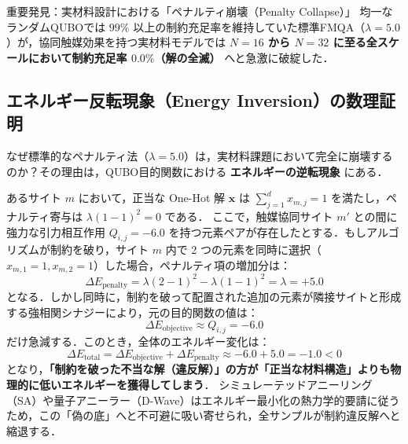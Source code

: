 \documentclass[11pt,a4paper]{ltjsarticle}
\begin{document}
\begin{alertbox}{重要発見：実材料設計における「ペナルティ崩壊（Penalty Collapse）」}
均一なランダムQUBOでは $99\%$ 以上の制約充足率を維持していた標準FMQA（$\lambda=5.0$）が，協同触媒効果を持つ実材料モデルでは \textbf{$N=16$ から $N=32$ に至る全スケールにおいて制約充足率 $0.0\%$（解の全滅）} へと急激に破綻した．
\end{alertbox}

\vspace{-1mm}
\subsection{エネルギー反転現象（Energy Inversion）の数理証明}
なぜ標準的なペナルティ法（$\lambda=5.0$）は，実材料課題において完全に崩壊するのか？その理由は，QUBO目的関数における \textbf{エネルギーの逆転現象} にある．

あるサイト $m$ において，正当な One-Hot 解 $\bm{x}$ は $\sum_{j=1}^d x_{m,j} = 1$ を満たし，ペナルティ寄与は $\lambda (1 - 1)^2 = 0$ である．
ここで，触媒協同サイト $m'$ との間に強力な引力相互作用 $Q_{i, j} = -6.0$ を持つ元素ペアが存在したとする．もしアルゴリズムが制約を破り，サイト $m$ 内で 2 つの元素を同時に選択（$x_{m, 1} = 1, x_{m, 2} = 1$）した場合，ペナルティ項の増加分は：
\begin{equation}
\Delta E_{\mathrm{penalty}} = \lambda (2 - 1)^2 - \lambda (1 - 1)^2 = \lambda = +5.0
\end{equation}
となる．しかし同時に，制約を破って配置された追加の元素が隣接サイトと形成する強相関シナジーにより，元の目的関数の値は：
\begin{equation}
\Delta E_{\mathrm{objective}} \approx Q_{i, j} = -6.0
\end{equation}
だけ急減する．このとき，全体のエネルギー変化は：
\begin{equation}
\Delta E_{\mathrm{total}} = \Delta E_{\mathrm{objective}} + \Delta E_{\mathrm{penalty}} \approx -6.0 + 5.0 = -1.0 < 0
\end{equation}
となり，\textbf{「制約を破った不当な解（違反解）」の方が「正当な材料構造」よりも物理的に低いエネルギーを獲得してしまう}．
シミュレーテッドアニーリング（SA）や量子アニーラー（D-Wave）はエネルギー最小化の熱力学的要請に従うため，この「偽の底」へと不可避に吸い寄せられ，全サンプルが制約違反解へと縮退する．
\end{document}
